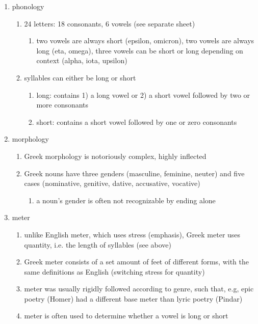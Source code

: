 \documentclass[12pt]{article}
\begin{document}
\begin{enumerate}
\item phonology
    \begin{enumerate}
    \item 24 letters: 18 consonants, 6 vowels (see separate sheet)
        \begin{enumerate}
        \item two vowels are always short (epsilon, omicron), two vowels are always long (eta, omega), three vowels can be short or long depending on context (alpha, iota, upsilon)
        \end{enumerate}
    \item syllables can either be long or short
        \begin{enumerate}
        \item long: contains 1) a long vowel or 2) a short vowel followed by two or more consonants
        \item short: contains a short vowel followed by one or zero consonants
        \end{enumerate}
    \end{enumerate}
    \item morphology
        \begin{enumerate}
        \item Greek morphology is notoriously complex, highly inflected
        \item Greek nouns have three genders (masculine, feminine, neuter) and five cases (nominative, genitive, dative, accusative, vocative)
            \begin{enumerate}
            \item a noun's gender is often not recognizable by ending alone
            \end{enumerate}
        \end{enumerate}
    \item meter
        \begin{enumerate}
        \item unlike English meter, which uses stress (emphasis), Greek meter uses quantity, i.e. the length of syllables (see above)
        \item Greek meter consists of a set amount of feet of different forms, with the same definitions as English (switching stress for quantity)
        \item meter was usually rigidly followed according to genre, such that, e.g, epic poetry (Homer) had a different base meter than lyric poetry (Pindar)
        \item meter is often used to determine whether a vowel is long or short

\end{enumerate}
\end{enumerate}
\end{document}
